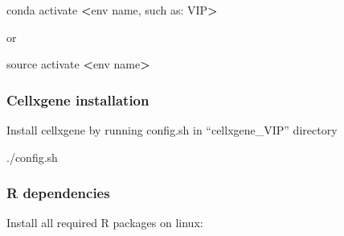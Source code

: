 \documentclass[
]{article}
\newenvironment{Shaded}{\begin{snugshade}}{\end{snugshade}}
\newcommand{\BuiltInTok}[1]{#1}
\newcommand{\ExtensionTok}[1]{#1}
\newcommand{\NormalTok}[1]{#1}
\newcommand{\OperatorTok}[1]{\textcolor[rgb]{0.81,0.36,0.00}{\textbf{#1}}}
\begin{document}
\begin{Shaded}
\begin{Highlighting}[]
\ExtensionTok{conda}\NormalTok{ activate }\OperatorTok{\textless{}}\NormalTok{env name, such as: VIP}\OperatorTok{\textgreater{}}
\end{Highlighting}
\end{Shaded}

or

\begin{Shaded}
\begin{Highlighting}[]
\BuiltInTok{source}\NormalTok{ activate }\OperatorTok{\textless{}}\NormalTok{env name}\OperatorTok{\textgreater{}}
\end{Highlighting}
\end{Shaded}

\hypertarget{cellxgene-installation}{%
\subsubsection{Cellxgene installation}\label{cellxgene-installation}}

Install cellxgene by running config.sh in ``cellxgene\_VIP'' directory

\begin{Shaded}
\begin{Highlighting}[]
\ExtensionTok{./config.sh}
\end{Highlighting}
\end{Shaded}

\hypertarget{r-dependencies}{%
\subsubsection{R dependencies}\label{r-dependencies}}

Install all required R packages on linux:
\end{document}
